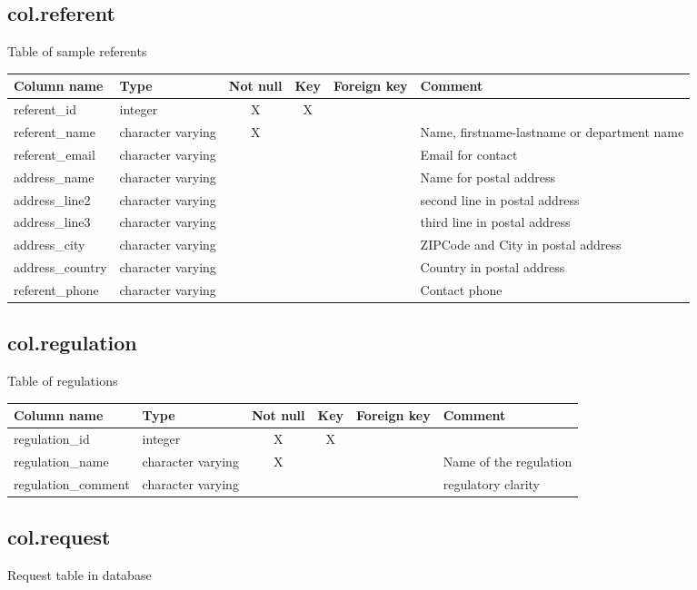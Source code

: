 \subsection{col.referent}
Table of sample referents

\begin{tabular}{|l| p{2cm}|c|c|c| p{3cm}|}
\hline
Column name & Type & Not null & Key & Foreign key & Comment \\
\hline
referent\_id & integer & X & X & & \\
\hline
referent\_name & character varying & X & & & Name, firstname-lastname or department name\\
\hline
referent\_email & character varying & & & & Email for contact\\
\hline
address\_name & character varying & & & & Name for postal address\\
\hline
address\_line2 & character varying & & & & second line in postal address\\
\hline
address\_line3 & character varying & & & & third line in postal address\\
\hline
address\_city & character varying & & & & ZIPCode and City in postal address\\
\hline
address\_country & character varying & & & & Country in postal address\\
\hline
referent\_phone & character varying & & & & Contact phone\\
\hline
\end{tabular}
\subsection{col.regulation}
Table of regulations

\begin{tabular}{|l| p{2cm}|c|c|c| p{3cm}|}
\hline
Column name & Type & Not null & Key & Foreign key & Comment \\
\hline
regulation\_id & integer & X & X & & \\
\hline
regulation\_name & character varying & X & & & Name of the regulation\\
\hline
regulation\_comment & character varying & & & & regulatory clarity\\
\hline
\end{tabular}
\subsection{col.request}
Request table in database

